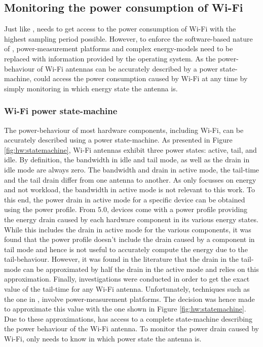 \subsection{Monitoring the power consumption of Wi-Fi}

Just like \eprof{}, \Orka{} needs to get access to the power consumption 
of Wi-Fi with the highest sampling period possible. However, to enforce 
the software-based nature of \Orka{}, power-measurement platforms and 
complex energy-models need to be replaced with information provided by 
the operating system. As the power-behaviour of Wi-Fi antennas can be 
accurately described by a power state-machine, \Orka{} could access the 
power consumption caused by Wi-Fi at any time by simply monitoring in 
which energy state the antenna is.

\subsubsection{Wi-Fi power state-machine}

The power-behaviour of most hardware components, including Wi-Fi, can be 
accurately described using a power state-machine. As presented in Figure 
\ref{fig:hw:statemachine}, Wi-Fi antennas exhibit three power states: 
active, tail, and idle. By definition, the bandwidth in idle and tail 
mode, as well as the drain in idle mode are always zero. The bandwidth 
and drain in active mode, the tail-time and the tail drain differ from 
one antenna to another. As \Orka{} only focusses on energy and not 
workload, the bandwidth in active mode is not relevant to this work. To 
this end, the power drain in active mode for a specific device can be 
obtained using the power profile. From \Android{} 5.0, devices come with 
a power profile providing the energy drain caused by each hardware 
component in its various energy states. While this includes the drain in 
active mode for the various components, it was found that the power 
profile doesn't include the drain caused by a component in tail mode and 
hence is not useful to accurately compute the energy due to the 
tail-behaviour. However, it was found in the literature that the drain 
in the tail-mode can be approximated by half the drain in the active 
mode \cite{efficient-downloads} and \Orka{} relies on this 
approximation. Finally, investigations were conducted in order to get 
the exact value of the tail-time for any Wi-Fi antenna. Unfortunately, 
techniques such as the one in \cite{Ding:2013:CMI:2465529.2466586}, 
involve power-measurement platforms. The decision was hence made to 
approximate this value with the one shown in Figure 
\ref{fig:hw:statemachine}. Due to these approximations, \Orka{} has 
access to a complete state-machine describing the power behaviour of the 
Wi-Fi antenna. To monitor the power drain caused by Wi-Fi, \Orka{} only 
needs to know in which power state the antenna is.

